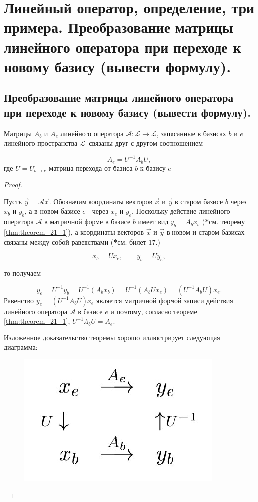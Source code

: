 \section{
    Линейный оператор, определение, три примера. Преобразование матрицы линейного оператора при переходе к новому базису (вывести формулу).
 }

\subsection{
    Преобразование матрицы линейного оператора при переходе к новому базису (вывести формулу).
}

\begin{theorem}
    Матрицы $A_b$ и $A_e$ линейного оператора $\mathscr{A} \colon \mathcal{L} \to \mathcal{L}$, записанные в базисах $b$ и $e$ линейного пространства $\mathcal{L}$, связаны друг с другом соотношением
    
    $$A_e = U^{-1}A_bU,$$
    где $U = U_{b \to e}$ матрица перехода от базиса $b$ к базису $e$.
\end{theorem}

\begin{proof}~

    Пусть $\vec{y} = \mathscr{A}\vec{x}$. Обозначим координаты векторов $\vec{x}$ и $\vec{y}$ в старом базисе $b$ через $x_b$ и $y_b$, а в новом базисе $e$ - через $x_e$ и $y_e$. Поскольку действие линейного оператора $\mathscr{A}$ в матричной форме в базисе $b$ имеет вид $y_b = A_bx_b$ (\textbf{*}см. теорему \ref{thm:theorem_21_1}), а координаты векторов $\vec{x}$ и $\vec{y}$ в новом и старом базисах связаны между собой равенствами (\textbf{*}см. билет 17.)

    $$x_b = Ux_e, \quad \quad y_b = Uy_e,$$

    то получаем

    $$y_e = U^{-1}y_b = U^{-1}(A_bx_b) = U^{-1}(A_bUx_e) = (U^{-1}A_bU)x_e.$$
    Равенство $y_e = (U^{-1}A_bU)x_e$ является матричной формой записи действия линейного оператора $\mathscr{A}$ в базисе $e$ и поэтому, согласно теореме \ref{thm:theorem_21_1}, $U^{-1}A_bU = A_e$. 

    Изложенное доказательство теоремы хорошо иллюстрирует следующая диаграмма:

    \begin{figure}[H]
        \centering
        \includegraphics[scale=0.5]{images/22_1.jpg}
        \label{fig:picture_22_1}
    \end{figure}
\end{proof}